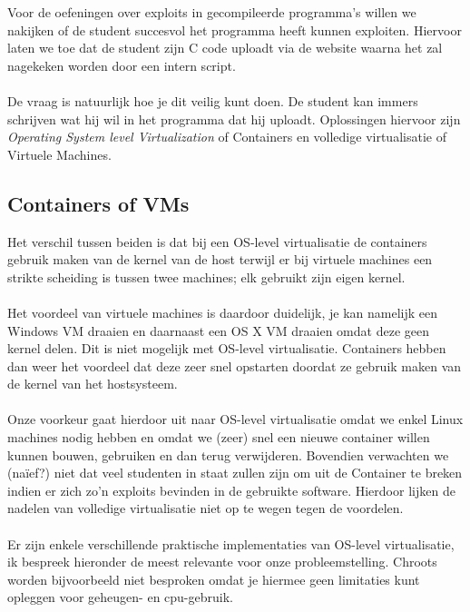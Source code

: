Voor de oefeningen over exploits in gecompileerde programma's willen we nakijken of de student succesvol het programma heeft kunnen exploiten. Hiervoor laten we toe dat de student zijn C code uploadt via de website waarna het zal nagekeken worden door een intern script.\\
\\
De vraag is natuurlijk hoe je dit veilig kunt doen. De student kan immers schrijven wat hij wil in het programma dat hij uploadt. Oplossingen hiervoor zijn \emph{Operating System level Virtualization} of Containers en volledige virtualisatie of Virtuele Machines.

\subsection{Containers of VMs}
Het verschil tussen beiden is dat bij een OS-level virtualisatie de containers gebruik maken van de kernel van de host terwijl er bij virtuele machines een strikte scheiding is tussen twee machines; elk gebruikt zijn eigen kernel.\\
\\
Het voordeel van virtuele machines is daardoor duidelijk, je kan namelijk een Windows VM draaien en daarnaast een OS X VM draaien omdat deze geen kernel delen. Dit is niet mogelijk met OS-level virtualisatie. Containers hebben dan weer het voordeel dat deze zeer snel opstarten doordat ze gebruik maken van de kernel van het hostsysteem.\\
\\
Onze voorkeur gaat hierdoor uit naar OS-level virtualisatie omdat we enkel Linux machines nodig hebben en omdat we (zeer) snel een nieuwe container willen kunnen bouwen, gebruiken en dan terug verwijderen. Bovendien verwachten we (na\"ief?) niet dat veel studenten in staat zullen zijn om uit de Container te breken indien er zich zo'n exploits bevinden in de gebruikte software. Hierdoor lijken de nadelen van volledige virtualisatie niet op te wegen tegen de voordelen.\\
\\
Er zijn enkele verschillende praktische implementaties van OS-level virtualisatie, ik bespreek hieronder de meest relevante voor onze probleemstelling. Chroots worden bijvoorbeeld niet besproken omdat je hiermee geen limitaties kunt opleggen voor geheugen- en cpu-gebruik.
